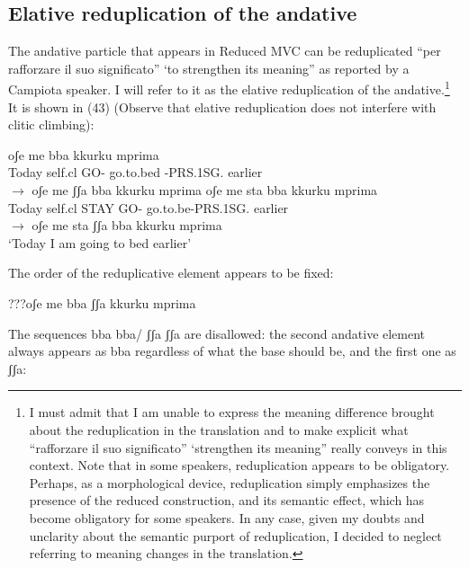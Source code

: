 \documentclass[output=paper,colorlinks,citecolor=brown,
]{langscibook}
\begin{document}
\subsection{Elative reduplication of the andative}

The andative particle that appears in Reduced MVC can be reduplicated “per rafforzare il suo significato” ‘to strengthen its meaning” as reported by a Campiota speaker.  I will refer to it as the elative reduplication of the andative.\footnote{  I must admit that I am unable to express the meaning difference brought about the reduplication in the translation and to make explicit what “rafforzare il suo significato” ‘strengthen its meaning” really conveys in this context.  Note that in some speakers, reduplication appears to be obligatory.  Perhaps, as a morphological device, reduplication simply emphasizes the presence of the reduced construction, and its semantic effect, which has become obligatory for some speakers. In any case, given my doubts and unclarity about the semantic purport of reduplication, I decided to neglect referring to meaning changes in the translation.}  It is shown in (43) (Observe that elative reduplication does not interfere with clitic climbing):

\ea
    \ea
        \ea \gll oʃe    me      bba   kkurku         mprima\\
       Today self.cl    GO-   go.to.bed -PRS.1SG.   earlier\\
        \ex $\rightarrow$ oʃe    me    ʃʃa  bba   kkurku         mprima
        \z
    \ex
        \ea \gll oʃe    me   sta     bba  kkurku      mprima\\
       Today self.cl  STAY  GO-  go.to.be-PRS.1SG.   earlier\\
        \ex   $\rightarrow$ oʃe    me   sta   ʃʃa bba  kkurku mprima\\
       ‘Today I am going to bed earlier’  
        \z
    \z
\z
 
The order of the reduplicative element appears to be fixed:

\ea ???oʃe me bba ʃʃa kkurku mprima
\z

The sequences bba bba/ ʃʃa ʃʃa are disallowed: the second andative element always appears as bba regardless of what the base should be, and the first one as ʃʃa:
\end{document}
